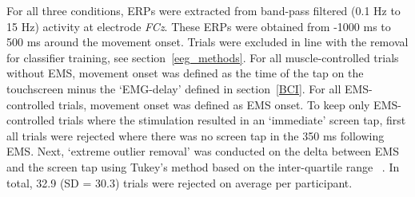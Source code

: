 For all three conditions, ERPs were extracted from band-pass filtered (0.1 Hz to 15 Hz) activity at electrode \textit{FCz}. These ERPs were obtained from -1000 ms to 500 ms around the movement onset. Trials were excluded in line with the removal for classifier training, see section~\ref{eeg_methods}. For all muscle-controlled trials without EMS, movement onset was defined as the time of the tap on the touchscreen minus the `EMG-delay' defined in section~\ref{BCI}. For all EMS-controlled trials, movement onset was defined as EMS onset. To keep only EMS-controlled trials where the stimulation resulted in an `immediate' screen tap, first all trials were rejected where there was no screen tap in the 350 ms following EMS. Next, `extreme outlier removal' was conducted on the delta between EMS and the screen tap using Tukey's method based on the inter-quartile range ~\cite{Tukey1949-sl}. In total, 32.9 (SD = 30.3) trials were rejected on average per participant.



